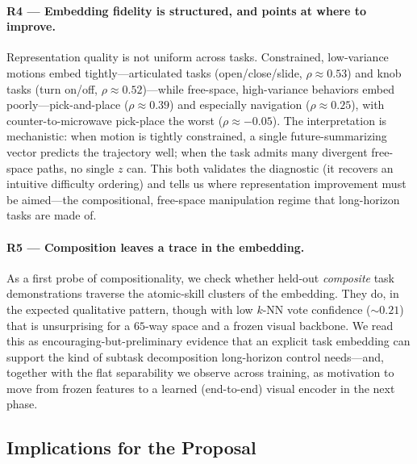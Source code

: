 \paragraph{R4 --- Embedding fidelity is structured, and points at where to
improve.} Representation quality is not uniform across tasks. Constrained,
low-variance motions embed tightly---articulated tasks (open/close/slide,
$\rho \approx 0.53$) and knob tasks (turn on/off, $\rho \approx 0.52$)---while
free-space, high-variance behaviors embed poorly---pick-and-place
($\rho \approx 0.39$) and especially navigation ($\rho \approx 0.25$), with
counter-to-microwave pick-place the worst ($\rho \approx -0.05$). The
interpretation is mechanistic: when motion is tightly constrained, a single
future-summarizing vector predicts the trajectory well; when the task admits
many divergent free-space paths, no single $z$ can. This both validates the
diagnostic (it recovers an intuitive difficulty ordering) and tells us where
representation improvement must be aimed---the compositional, free-space
manipulation regime that long-horizon tasks are made of.

\paragraph{R5 --- Composition leaves a trace in the embedding.} As a first probe
of compositionality, we check whether held-out \emph{composite} task
demonstrations traverse the atomic-skill clusters of the embedding. They do, in
the expected qualitative pattern, though with low $k$-NN vote confidence
($\sim\!0.21$) that is unsurprising for a $65$-way space and a frozen visual
backbone. We read this as encouraging-but-preliminary evidence that an explicit
task embedding can support the kind of subtask decomposition long-horizon
control needs---and, together with the flat separability we observe across
training, as motivation to move from frozen features to a learned (end-to-end)
visual encoder in the next phase.

\subsection{Implications for the Proposal}
\label{sec:findings:implications}

